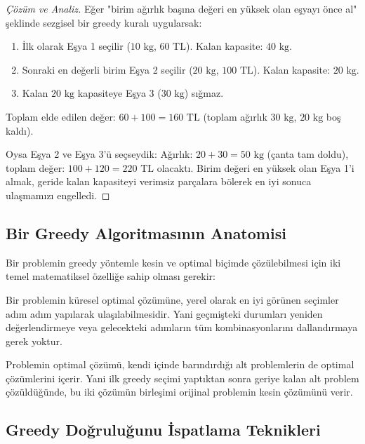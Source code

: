 \begin{proof}[Çözüm ve Analiz]
Eğer "birim ağırlık başına değeri en yüksek olan eşyayı önce al" şeklinde sezgisel bir greedy kuralı uygularsak:
\begin{enumerate}
    \item İlk olarak Eşya 1 seçilir ($10\text{ kg}$, $60\text{ TL}$). Kalan kapasite: $40\text{ kg}$.
    \item Sonraki en değerli birim Eşya 2 seçilir ($20\text{ kg}$, $100\text{ TL}$). Kalan kapasite: $20\text{ kg}$.
    \item Kalan $20\text{ kg}$ kapasiteye Eşya 3 ($30\text{ kg}$) sığmaz.
\end{enumerate}
Toplam elde edilen değer: $60 + 100 = 160\text{ TL}$ (toplam ağırlık $30\text{ kg}$, $20\text{ kg}$ boş kaldı).

Oysa Eşya 2 ve Eşya 3'ü seçseydik:
Ağırlık: $20 + 30 = 50\text{ kg}$ (çanta tam doldu), toplam değer: $100 + 120 = 220\text{ TL}$ olacaktı. Birim değeri en yüksek olan Eşya 1'i almak, geride kalan kapasiteyi verimsiz parçalara bölerek en iyi sonuca ulaşmamızı engelledi.
\end{proof}

\subsection{Bir Greedy Algoritmasının Anatomisi}

Bir problemin greedy yöntemle kesin ve optimal biçimde çözülebilmesi için iki temel matematiksel özelliğe sahip olması gerekir:

\begin{definition}
Bir problemin küresel optimal çözümüne, yerel olarak en iyi görünen seçimler adım adım yapılarak ulaşılabilmesidir. Yani geçmişteki durumları yeniden değerlendirmeye veya gelecekteki adımların tüm kombinasyonlarını dallandırmaya gerek yoktur.
\end{definition}

\begin{definition}
Problemin optimal çözümü, kendi içinde barındırdığı alt problemlerin de optimal çözümlerini içerir. Yani ilk greedy seçimi yaptıktan sonra geriye kalan alt problem çözüldüğünde, bu iki çözümün birleşimi orijinal problemin kesin çözümünü verir.
\end{definition}

\subsection{Greedy Doğruluğunu İspatlama Teknikleri}

